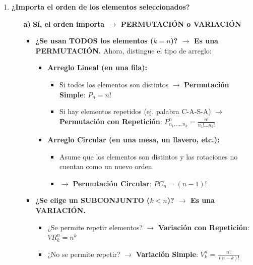 \documentclass[12pt, letterpaper]{article}
\begin{document}
\begin{enumerate}[label=\bfseries, wide]
    \item \textbf{¿Importa el orden de los elementos seleccionados?}
    \begin{itemize}
        \item[\bfseries a)] \textbf{Sí, el orden importa $\rightarrow$ PERMUTACIÓN o VARIACIÓN}
            \begin{itemize}
                \item \textbf{¿Se usan TODOS los elementos ($k=n$)? $\rightarrow$ Es una PERMUTACIÓN.}
                \noindent Ahora, distingue el tipo de arreglo:
                    \begin{itemize}
                        \item \textbf{Arreglo Lineal (en una fila):}
                            \begin{itemize}
                                \item Si todos los elementos son distintos $\rightarrow$ \textbf{Permutación Simple}: 
                                      $ P_n = n! $
                                \item Si hay elementos repetidos (ej. palabra C-A-S-A) $\rightarrow$ \textbf{Permutación con Repetición}: 
                                      $ P_{n_1, \dots, n_k}^n = \frac{n!}{n_1! \dots n_k!} $
                            \end{itemize}
                        
                        \item \textbf{Arreglo Circular (en una mesa, un llavero, etc.):}
                            \begin{itemize}
                                \item Asume que los elementos son distintos y las rotaciones no cuentan como un nuevo orden.
                                \item $\rightarrow$ \textbf{Permutación Circular}: $ PC_n = (n-1)! $
                            \end{itemize}
                    \end{itemize}

                \item \textbf{¿Se elige un SUBCONJUNTO ($k<n$)? $\rightarrow$ Es una VARIACIÓN.}
                    \begin{itemize}
                        \item ¿Se permite repetir elementos? $\rightarrow$ \textbf{Variación con Repetición}: $ VR_k^n = n^k $
                        \item ¿No se permite repetir? $\rightarrow$ \textbf{Variación Simple}: $ V_k^n = \frac{n!}{(n-k)!} $
                    \end{itemize}
            \end{itemize}
        

\end{itemize}
\end{enumerate}
\end{document}
